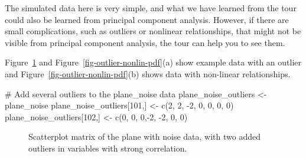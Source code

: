 \documentclass[
  letterpaper,
]{krantz}
\newenvironment{Shaded}{\begin{snugshade}}{\end{snugshade}}
\newcommand{\CommentTok}[1]{\textcolor[rgb]{0.37,0.37,0.37}{#1}}
\newcommand{\DecValTok}[1]{\textcolor[rgb]{0.68,0.00,0.00}{#1}}
\newcommand{\FunctionTok}[1]{\textcolor[rgb]{0.28,0.35,0.67}{#1}}
\newcommand{\NormalTok}[1]{\textcolor[rgb]{0.00,0.23,0.31}{#1}}
\newcommand{\OtherTok}[1]{\textcolor[rgb]{0.00,0.23,0.31}{#1}}
\newcommand{\SpecialCharTok}[1]{\textcolor[rgb]{0.37,0.37,0.37}{#1}}
\begin{document}
The simulated data here is very simple, and what we have learned from
the tour could also be learned from principal component analysis.
However, if there are small complications, such as outliers or nonlinear
relationships, that might not be visible from principal component
analysis, the tour can help you to see them.

Figure~\ref{fig-plane-noise-outlier} and
Figure~\ref{fig-outlier-nonlin-pdf}(a) show example data with an outlier
and Figure~\ref{fig-outlier-nonlin-pdf}(b) shows data with non-linear
relationships.

\begin{Shaded}
\begin{Highlighting}[]
\CommentTok{\# Add several outliers to the plane\_noise data}
\NormalTok{plane\_noise\_outliers }\OtherTok{\textless{}{-}}\NormalTok{ plane\_noise}
\NormalTok{plane\_noise\_outliers[}\DecValTok{101}\NormalTok{,] }\OtherTok{\textless{}{-}} \FunctionTok{c}\NormalTok{(}\DecValTok{2}\NormalTok{, }\DecValTok{2}\NormalTok{, }\SpecialCharTok{{-}}\DecValTok{2}\NormalTok{, }\DecValTok{0}\NormalTok{, }\DecValTok{0}\NormalTok{, }\DecValTok{0}\NormalTok{, }\DecValTok{0}\NormalTok{)}
\NormalTok{plane\_noise\_outliers[}\DecValTok{102}\NormalTok{,] }\OtherTok{\textless{}{-}} \FunctionTok{c}\NormalTok{(}\DecValTok{0}\NormalTok{, }\DecValTok{0}\NormalTok{, }\DecValTok{0}\NormalTok{,}\SpecialCharTok{{-}}\DecValTok{2}\NormalTok{, }\SpecialCharTok{{-}}\DecValTok{2}\NormalTok{, }\DecValTok{0}\NormalTok{, }\DecValTok{0}\NormalTok{)}
\end{Highlighting}
\end{Shaded}

\begin{figure}


\caption{\label{fig-plane-noise-outlier}Scatterplot matrix of the plane
with noise data, with two added outliers in variables with strong
correlation.}

\end{figure}%
\end{document}
